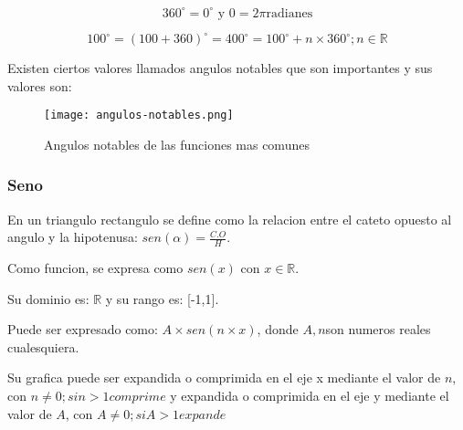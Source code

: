 $$ 360^\circ = 0^\circ \text{ y  } 0 = 2\pi \text{radianes}   $$

$$ 100^\circ = (100+360)^\circ = 400^\circ = 100^\circ + n\times360^\circ; n\in \mathbb{R} $$

Existen ciertos valores llamados angulos notables que son importantes y sus
valores son:


    \begin{figure}[htb]
 		\centering
		\texttt{[image: angulos-notables.png]}
        \caption{Angulos notables de las funciones mas comunes}
	\end{figure}




\subsubsection{Seno} \label{Sen}
En un triangulo rectangulo se define como la relacion entre el cateto opuesto al
angulo y la hipotenusa: $ sen(\alpha)= \frac{C.O}{H} $.

Como funcion, se expresa como $ sen(x) \text{ con  }x\in\mathbb{R} $.

Su dominio es: $ \mathbb{R} $ y su rango es: [-1,1].

Puede ser expresado como: $ A\times sen(n\times x) $, donde $A,n$son numeros reales
cualesquiera.

Su grafica puede ser expandida o comprimida en el eje x mediante el valor de $n$,
con $ n \not = 0; si n>1 comprime $  y  expandida o comprimida en el eje y
mediante el valor de $ A $, con $ A \not = 0; si A>1 expande $

\begin{center}
\end{center}



